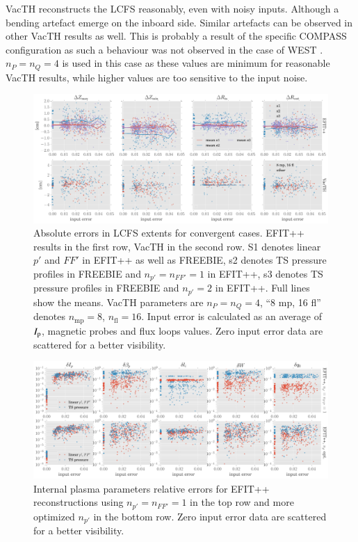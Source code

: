 VacTH reconstructs the LCFS reasonably, even with noisy inputs. Although a bending artefact emerge on the inboard side. Similar artefacts can be observed in other VacTH results as well. This is probably a result of the specific COMPASS configuration as such a behaviour was not observed in the case of WEST \cite{vacthref}. $n_P = n_Q = 4$ is used in this case as these values are minimum for reasonable VacTH results, while higher values are too sensitive to the input noise.

\begin{figure}[!htb]
\centering   %
\hfill{}
\includegraphics[width=18cm]{RZstats.pdf}
\hfill{}
\caption{Absolute errors in LCFS extents for convergent cases. EFIT++ results in the first row, VacTH in the second row. S1 denotes linear $p'$ and $FF'$ in EFIT++ as well as FREEBIE, s2 denotes TS pressure profiles in FREEBIE and $n_{p'} = n_{FF'} = 1$ in EFIT++, s3 denotes TS pressure profiles in FREEBIE and $n_{p'} = 2$ in EFIT++. Full lines show the means. VacTH parameters are $n_P=n_Q=4$, ``8 mp, 16 fl'' denotes $n_\mathrm{mp}=8$, $n_\mathrm{fl}=16$. Input error is calculated as an average of $I_{\rm{p}}$, magnetic probes and flux loops values. Zero input error data are scattered for a better visibility.}
\label{fig:RZstats}
\end{figure}

\begin{figure}[!htb]
\centering   %
\hfill{}
\includegraphics[width=18cm]{kinetic_stats_opt.pdf}
\hfill{}
\caption{Internal plasma parameters relative errors for EFIT++ reconstructions using $n_{p'}=n_{FF'}=1$ in the top row and more optimized $n_{p'}$ in the bottom row. Zero input error data are scattered for a better visibility.}
\label{fig:kinetic_stats}
\end{figure}


